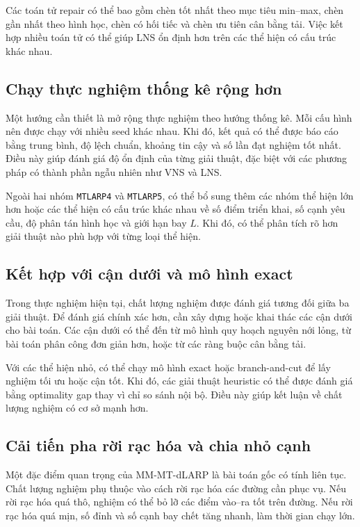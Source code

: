 Các toán tử repair có thể bao gồm chèn tốt nhất theo mục tiêu min--max, chèn gần nhất theo hình học, chèn có hối tiếc và chèn ưu tiên cân bằng tải. Việc kết hợp nhiều toán tử có thể giúp LNS ổn định hơn trên các thể hiện có cấu trúc khác nhau.

\subsection{Chạy thực nghiệm thống kê rộng hơn}
\label{subsec:future-experiments}

Một hướng cần thiết là mở rộng thực nghiệm theo hướng thống kê. Mỗi cấu hình nên được chạy với nhiều seed khác nhau. Khi đó, kết quả có thể được báo cáo bằng trung bình, độ lệch chuẩn, khoảng tin cậy và số lần đạt nghiệm tốt nhất. Điều này giúp đánh giá độ ổn định của từng giải thuật, đặc biệt với các phương pháp có thành phần ngẫu nhiên như VNS và LNS.

Ngoài hai nhóm \texttt{MTLARP4} và \texttt{MTLARP5}, có thể bổ sung thêm các nhóm thể hiện lớn hơn hoặc các thể hiện có cấu trúc khác nhau về số điểm triển khai, số cạnh yêu cầu, độ phân tán hình học và giới hạn bay \(L\). Khi đó, có thể phân tích rõ hơn giải thuật nào phù hợp với từng loại thể hiện.

\subsection{Kết hợp với cận dưới và mô hình exact}
\label{subsec:future-exact}

Trong thực nghiệm hiện tại, chất lượng nghiệm được đánh giá tương đối giữa ba giải thuật. Để đánh giá chính xác hơn, cần xây dựng hoặc khai thác các cận dưới cho bài toán. Các cận dưới có thể đến từ mô hình quy hoạch nguyên nới lỏng, từ bài toán phân công đơn giản hơn, hoặc từ các ràng buộc cân bằng tải.

Với các thể hiện nhỏ, có thể chạy mô hình exact hoặc branch-and-cut để lấy nghiệm tối ưu hoặc cận tốt. Khi đó, các giải thuật heuristic có thể được đánh giá bằng optimality gap thay vì chỉ so sánh nội bộ. Điều này giúp kết luận về chất lượng nghiệm có cơ sở mạnh hơn.

\subsection{Cải tiến pha rời rạc hóa và chia nhỏ cạnh}
\label{subsec:future-discretization}

Một đặc điểm quan trọng của MM-MT-dLARP là bài toán gốc có tính liên tục. Chất lượng nghiệm phụ thuộc vào cách rời rạc hóa các đường cần phục vụ. Nếu rời rạc hóa quá thô, nghiệm có thể bỏ lỡ các điểm vào--ra tốt trên đường. Nếu rời rạc hóa quá mịn, số đỉnh và số cạnh bay chết tăng nhanh, làm thời gian chạy lớn.

